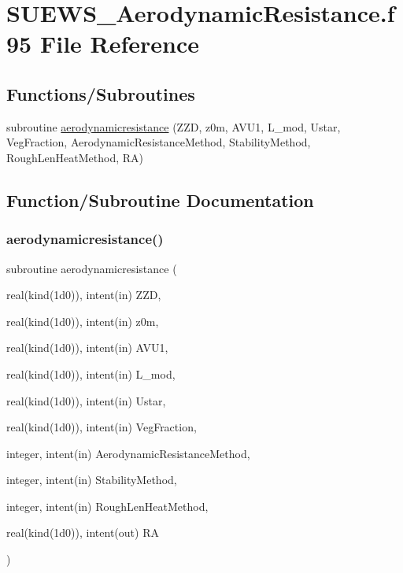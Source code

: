 \hypertarget{_s_u_e_w_s___aerodynamic_resistance_8f95}{}\section{S\+U\+E\+W\+S\+\_\+\+Aerodynamic\+Resistance.\+f95 File Reference}
\label{_s_u_e_w_s___aerodynamic_resistance_8f95}
\subsection*{Functions/\+Subroutines}
\begin{DoxyCompactItemize}
\item 
subroutine \hyperlink{_s_u_e_w_s___aerodynamic_resistance_8f95_a04f1fea7666166223b4895686e96bcbf}{aerodynamicresistance} (Z\+ZD, z0m, A\+V\+U1, L\+\_\+mod, Ustar, Veg\+Fraction, Aerodynamic\+Resistance\+Method, Stability\+Method, Rough\+Len\+Heat\+Method, RA)
\end{DoxyCompactItemize}


\subsection{Function/\+Subroutine Documentation}
\mbox{\label{_s_u_e_w_s___aerodynamic_resistance_8f95_a04f1fea7666166223b4895686e96bcbf}} 
\subsubsection{\texorpdfstring{aerodynamicresistance()}{aerodynamicresistance()}}
{\footnotesize\ttfamily subroutine aerodynamicresistance (\begin{DoxyParamCaption}\item[{real(kind(1d0)), intent(in)}]{Z\+ZD,  }\item[{real(kind(1d0)), intent(in)}]{z0m,  }\item[{real(kind(1d0)), intent(in)}]{A\+V\+U1,  }\item[{real(kind(1d0)), intent(in)}]{L\+\_\+mod,  }\item[{real(kind(1d0)), intent(in)}]{Ustar,  }\item[{real(kind(1d0)), intent(in)}]{Veg\+Fraction,  }\item[{integer, intent(in)}]{Aerodynamic\+Resistance\+Method,  }\item[{integer, intent(in)}]{Stability\+Method,  }\item[{integer, intent(in)}]{Rough\+Len\+Heat\+Method,  }\item[{real(kind(1d0)), intent(out)}]{RA }\end{DoxyParamCaption})}



